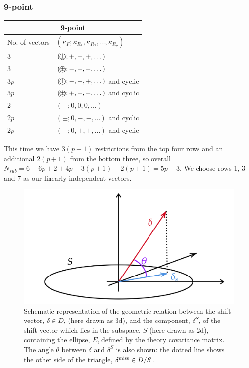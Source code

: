 \subsubsection{9-point}
\begin{center}
\begin{tabular}{ |p{3cm}|p{6cm}|  }
\hline
\multicolumn{2}{|c|}{9-point} \\
\hline
No. of vectors & $(\kappa_F; \kappa_{R_1}, \kappa_{R_2}, \dots , \kappa_{R_p})\ $  \\
\hline
3 & $({\pm}\hspace{-.9em}{\bigcirc}; +, +, +, \dots)$ \\
3 & $({\pm}\hspace{-.9em}{\bigcirc}; -, -, -, \dots)$ \\
3$p$ & $({\pm}\hspace{-.9em}{\bigcirc}; -, +, +, \dots)$ and cyclic\\
3$p$  & $({\pm}\hspace{-.9em}{\bigcirc}; +, -, -, \dots)$ and cyclic \\
2 & $(\pm; 0, 0, 0, \dots)$ \\
2$p$ & $(\pm; 0, -, -, \dots)$   and cyclic\\
2$p$ & $(\pm; 0, +, +, \dots)$ and cyclic \\
\hline
\end{tabular}
\end{center}
This time we have $3(p+1)$ restrictions from the top four rows and an additional $2(p+1)$ from the bottom three, so overall $N_{sub}=6 + 6p + 2 + 4p -3(p+1)-2(p+1) = 5p+3$. We choose rows 1, 3 and 7 as our linearly independent vectors.
\begin{figure}[H]
  \begin{center}
    \includegraphics[scale=0.27]{mhous/plots/subspace_diag.png}
    \caption{\small Schematic representation of the geometric relation
      between the shift vector, $\delta\in D$, (here drawn as 3d), and
      the component, $\delta^S$, of the shift vector which lies in the 
subspace, $S$ (here drawn as 2d), containing the ellipse, $E$, defined by the theory covariance matrix. The angle $\theta$ between $\delta$ and $\delta^S$ is also shown: the dotted line shows the other side of the triangle, $\delta^{\rm miss}\in D/S$.
    \label{fig:subspace_diagram} }
  \end{center}
\end{figure}
